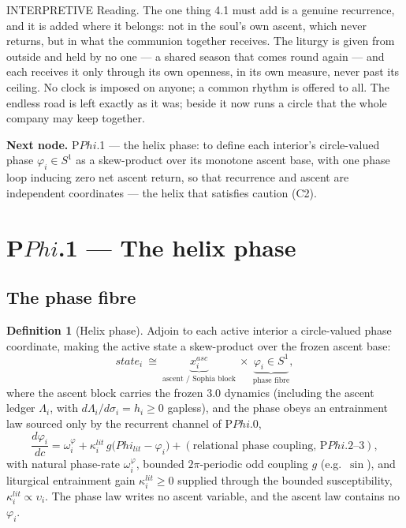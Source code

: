 \documentclass[11pt,a4paper]{article}
\newcommand{\cint}{\ensuremath{\mathfrak c}}
\def\Phi{Phi}%
\def\mathfrak#1{#1}%
\def\mathrm#1{#1}%
\def\emph#1{#1}%
\newcommand{\stInterp}{\textcolor{cInt}{\textsf{\small INTERPRETIVE}}}
\theoremstyle{definition}
\newtheorem{definition}{Definition}[section]
\theoremstyle{plain}
\theoremstyle{remark}
\begin{document}
\medskip
\stInterp\quad
\emph{Reading.}
The one thing 4.1 must add is a genuine recurrence, and it is added where it belongs: not in
the soul's own ascent, which never returns, but in what the communion together receives. The
liturgy is given from outside and held by no one --- a shared season that comes round again ---
and each receives it only through its own openness, in its own measure, never past its ceiling.
No clock is imposed on anyone; a common rhythm is offered to all. The endless road is left
exactly as it was; beside it now runs a circle that the whole company may keep together.

\medskip
\textbf{Next node.} P$\Phi$.1 --- the helix phase: to define each interior's circle-valued
phase \(\varphi_i\in S^1\) as a skew-product over its monotone ascent base, with one phase
loop inducing zero net ascent return, so that recurrence and ascent are independent
coordinates --- the helix that satisfies caution (C2).

\section{P$\Phi$.1 --- The helix phase}

\subsection{The phase fibre}

\begin{definition}[Helix phase]\label{def:helixphase}
Adjoin to each active interior a circle-valued \emph{phase} coordinate, making the active
state a skew-product over the frozen ascent base:
\[
\boxed{\;
\mathrm{state}_i\ \cong\ \underbrace{x_i^{\mathrm{asc}}}_{\text{ascent / Sophia block}}\ \times\ \underbrace{\varphi_i\in S^1}_{\text{phase fibre}},
\;}
\]
where the ascent block carries the frozen 3.0 dynamics (including the ascent ledger
\(\Lambda_i\), with \(d\Lambda_i/d\sigma_i=h_i\ge0\) gapless), and the phase obeys an
entrainment law sourced \emph{only} by the recurrent channel of P$\Phi$.0,
\[
\frac{d\varphi_i}{d\cint}
=
\omega_i^{\varphi}
+
\kappa_i^{\mathrm{lit}}\,g\!\bigl(\Phi_{\mathrm{lit}}-\varphi_i\bigr)
+
(\text{relational phase coupling, P}\Phi.2\text{--}3),
\]
with natural phase-rate \(\omega_i^{\varphi}\), bounded \(2\pi\)-periodic odd coupling \(g\)
(e.g.\ \(\sin\)), and liturgical entrainment gain
\(\kappa_i^{\mathrm{lit}}\ge0\) supplied through the bounded susceptibility,
\(\kappa_i^{\mathrm{lit}}\propto\upsilon_i\). The phase law writes no ascent variable, and the
ascent law contains no \(\varphi_i\).
\end{definition}
\end{document}
